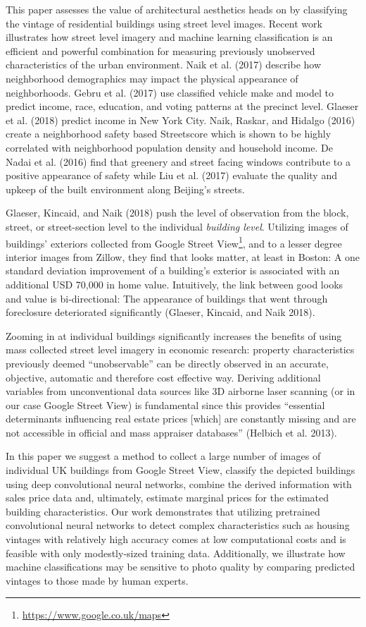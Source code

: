 \documentclass[]{article}
\let\rmarkdownfootnote\footnote%
\def\footnote{\protect\rmarkdownfootnote}
\begin{document}
This paper assesses the value of architectural aesthetics heads on by
classifying the vintage of residential buildings using street level
images. Recent work illustrates how street level imagery and machine
learning classification is an efficient and powerful combination for
measuring previously unobserved characteristics of the urban
environment. Naik et al. (2017) describe how neighborhood demographics
may impact the physical appearance of neighborhoods. Gebru et al. (2017)
use classified vehicle make and model to predict income, race,
education, and voting patterns at the precinct level. Glaeser et al.
(2018) predict income in New York City. Naik, Raskar, and Hidalgo (2016)
create a neighborhood safety based Streetscore which is shown to be
highly correlated with neighborhood population density and household
income. De Nadai et al. (2016) find that greenery and street facing
windows contribute to a positive appearance of safety while Liu et al.
(2017) evaluate the quality and upkeep of the built environment along
Beijing's streets.

Glaeser, Kincaid, and Naik (2018) push the level of observation from the
block, street, or street-section level to the individual
\emph{building level}. Utilizing images of buildings' exteriors
collected from Google Street
View\footnote{\href{https://www.google.co.uk/maps}{https://www.google.co.uk/maps}},
and to a lesser degree interior images from Zillow, they find that looks
matter, at least in Boston: A one standard deviation improvement of a
building's exterior is associated with an additional USD 70,000 in home
value. Intuitively, the link between good looks and value is
bi-directional: The appearance of buildings that went through
foreclosure deteriorated significantly (Glaeser, Kincaid, and Naik
2018).

Zooming in at individual buildings significantly increases the benefits
of using mass collected street level imagery in economic research:
property characteristics previously deemed ``unobservable'' can be
directly observed in an accurate, objective, automatic and therefore
cost effective way. Deriving additional variables from unconventional
data sources like 3D airborne laser scanning (or in our case Google
Street View) is fundamental since this provides ``essential determinants
influencing real estate prices {[}which{]} are constantly missing and
are not accessible in official and mass appraiser databases'' (Helbich
et al. 2013).

In this paper we suggest a method to collect a large number of images of
individual UK buildings from Google Street View, classify the depicted
buildings using deep convolutional neural networks, combine the derived
information with sales price data and, ultimately, estimate marginal
prices for the estimated building characteristics. Our work demonstrates
that utilizing pretrained convolutional neural networks to detect
complex characteristics such as housing vintages with relatively high
accuracy comes at low computational costs and is feasible with only
modestly-sized training data. Additionally, we illustrate how machine
classifications may be sensitive to photo quality by comparing predicted
vintages to those made by human experts.
\end{document}
